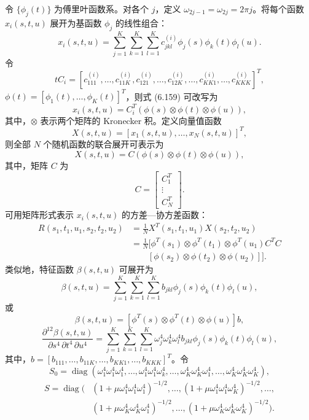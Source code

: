 令 $\{\phi_j(t)\}$ 为傅里叶函数系。对各个 $j$，定义 $\omega_{2j-1}=\omega_{2j}=2\pi j$。将每个函数 $x_i(s,t,u)$ 展开为基函数 $\phi_j$ 的线性组合：
\begin{equation}
x_i(s,t,u)=\sum_{j=1}^K\sum_{k=1}^K\sum_{l=1}^Kc_{jkl}^{(i)}\phi_j(s)\phi_k(t)\phi_l(u).
\tag{6.159}
\end{equation}
令
\[
tC_i=[c_{111}^{(i)},\ldots,c_{11K}^{(i)},c_{121}^{(i)},\ldots,c_{12K}^{(i)},\ldots,c_{KK1}^{(i)},\ldots,c_{KKK}^{(i)}]^T,
\]
$\phi(t)=[\phi_1(t),\ldots,\phi_K(t)]^T$，则式 (6.159) 可改写为
\begin{equation}
x_i(s,t,u)=C_i^T(\phi(s)\otimes\phi(t)\otimes\phi(u)),
\tag{6.160}
\end{equation}
其中，$\otimes$ 表示两个矩阵的 Kronecker 积。定义向量值函数
\[
X(s,t,u)=[x_1(s,t,u),\ldots,x_N(s,t,u)]^T,
\]
则全部 $N$ 个随机函数的联合展开可表示为
\begin{equation}
X(s,t,u)=C(\phi(s)\otimes\phi(t)\otimes\phi(u)),
\tag{6.161}
\end{equation}
其中，矩阵 $C$ 为
\[
C=\begin{bmatrix}C_1^T\\\vdots\\C_N^T\end{bmatrix}.
\]
可用矩阵形式表示 $x_i(s,t,u)$ 的方差—协方差函数：
\begin{equation}
\begin{aligned}
R(s_1,t_1,u_1,s_2,t_2,u_2)&=\frac1N X^T(s_1,t_1,u_1)X(s_2,t_2,u_2)\\
&=\frac1N[\phi^T(s_1)\otimes\phi^T(t_1)\otimes\phi^T(u_1)C^TC\\
&\qquad[\phi(s_2)\otimes\phi(t_2)\otimes\phi(u_2)]].
\end{aligned}\tag{6.162}
\end{equation}
类似地，特征函数 $\beta(s,t,u)$ 可展开为
\[
\beta(s,t,u)=\sum_{j=1}^K\sum_{k=1}^K\sum_{l=1}^Kb_{jkl}\phi_j(s)\phi_k(t)\phi_l(u),
\]
或
\[
\beta(s,t,u)=[\phi^T(s)\otimes\phi^T(t)\otimes\phi(u)]b,
\]
\[
\frac{\partial^{12}\beta(s,t,u)}{\partial s^4\,\partial t^4\,\partial u^4}=
\sum_{j=1}^K\sum_{k=1}^K\sum_{l=1}^K\omega_j^4\omega_k^4\omega_l^4b_{jkl}\phi_j(s)\phi_k(t)\phi_l(u),
\]
其中，$b=[b_{111},\ldots,b_{11K},\ldots,b_{KK1},\ldots,b_{KKK}]^T$。令
\[
S_0=\operatorname{diag}(\omega_1^4\omega_1^4\omega_1^4,\ldots,\omega_1^4\omega_1^4\omega_k^4,\ldots,\omega_K^4\omega_K^4\omega_1^4,\ldots,\omega_K^4\omega_K^4\omega_K^4),
\]
\[
\begin{aligned}
S=\operatorname{diag}\bigl(&(1+\mu\omega_1^4\omega_1^4\omega_1^4)^{-1/2},\ldots,(1+\mu\omega_1^4\omega_1^4\omega_K^4)^{-1/2},\ldots,\\
&(1+\mu\omega_K^4\omega_K^4\omega_1^4)^{-1/2},\ldots,(1+\mu\omega_K^4\omega_K^4\omega_K^4)^{-1/2}\bigr).
\end{aligned}
\]
